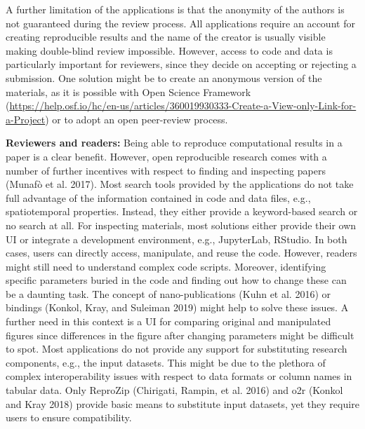 \documentclass[onecolumn]{article}
\begin{document}
A further limitation of the applications is that the anonymity of the
authors is not guaranteed during the review process. All applications
require an account for creating reproducible results and the name of the
creator is usually visible making double-blind review impossible.
However, access to code and data is particularly important for
reviewers, since they decide on accepting or rejecting a submission. One
solution might be to create an anonymous version of the materials, as it
is possible with Open Science Framework
(\url{https://help.osf.io/hc/en-us/articles/360019930333-Create-a-View-only-Link-for-a-Project})
or to adopt an open peer-review process.

\textbf{Reviewers and readers:} Being able to reproduce computational
results in a paper is a clear benefit. However, open reproducible
research comes with a number of further incentives with respect to
finding and inspecting papers (Munafò et al. 2017). Most search tools
provided by the applications do not take full advantage of the
information contained in code and data files, e.g., spatiotemporal
properties. Instead, they either provide a keyword-based search or no
search at all. For inspecting materials, most solutions either provide
their own UI or integrate a development environment, e.g., JupyterLab,
RStudio. In both cases, users can directly access, manipulate, and reuse
the code. However, readers might still need to understand complex code
scripts. Moreover, identifying specific parameters buried in the code
and finding out how to change these can be a daunting task. The concept
of nano-publications (Kuhn et al. 2016) or bindings (Konkol, Kray, and
Suleiman 2019) might help to solve these issues. A further need in this
context is a UI for comparing original and manipulated figures since
differences in the figure after changing parameters might be difficult
to spot. Most applications do not provide any support for substituting
research components, e.g., the input datasets. This might be due to the
plethora of complex interoperability issues with respect to data formats
or column names in tabular data. Only ReproZip (Chirigati, Rampin, et
al. 2016) and o2r (Konkol and Kray 2018) provide basic means to
substitute input datasets, yet they require users to ensure
compatibility.
\end{document}
